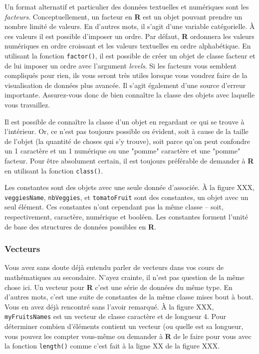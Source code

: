 \documentclass[10.5pt,a4paper]{article}
\begin{document}
    Un format alternatif et particulier des données textuelles et numériques sont les \emph{facteurs}. Conceptuellement, un facteur en \textbf{R} est un objet pouvant prendre un nombre limité de valeurs. En d'autres mots, il s'agit d'une variable catégorielle. À ces valeurs il est possible d'imposer un ordre. Par défaut, \textbf{R} ordonnera les valeurs numériques en ordre croissant et les valeurs textuelles en ordre alphabétique. En utilisant la fonction \texttt{factor()}, il est possible de créer un objet de classe facteur et de lui imposer un ordre avec l'argument \emph{levels}. Si les facteurs vous semblent compliqués pour rien, ils vous seront très utiles lorsque vous voudrez faire de la visualisation de données plus avancée. Il s'agit également d'une source d'erreur importante. Assurez-vous donc de bien connaître la classe des objets avec laquelle vous travaillez.
    
    Il est possible de connaître la classe d'un objet en regardant ce qui se trouve à l'intérieur. Or, ce n'est pas toujours possible ou évident, soit à cause de la taille de l'objet (la quantité de choses qui s'y trouve), soit parce qu'on peut confondre un 1 caractère et un 1 numérique ou une "pomme" caractère et une "pomme" facteur. Pour être absolument certain, il est toujours préférable de demander à \textbf{R} en utilisant la fonction \texttt{class()}.
    
    Les constantes sont des objets avec une seule donnée d'associée. À la figure XXX, \texttt{veggiesName}, \texttt{nbVeggies}, et \texttt{tomatoFruit} sont des constantes, un objet avec un seul élément. Ces constantes n'ont cependant pas la même classe -- soit, respectivement, caractère, numérique et booléen. Les constantes forment l'unité de base des structures de données possibles en \textbf{R}. 
    
    \subsubsection{Vecteurs}
    Vous avez sans doute déjà entendu parler de vecteurs dans vos cours de mathématiques au secondaire. N'ayez crainte, il n'est pas question de la même chose ici. Un vecteur pour \textbf{R} c'est une série de données du même type. En d'autres mots, c'est une suite de constantes de la même classe mises bout à bout. Vous en avez déjà rencontré sans l'avoir remarqué. À la figure XXX, \texttt{myFruitsNames} est un vecteur de classe caractère et de longueur 4. Pour déterminer combien d'éléments contient un vecteur (ou quelle est sa longueur, vous pouvez les compter vous-même ou demander à \textbf{R} de le faire pour vous avec la fonction \texttt{length()} comme c'est fait à la ligne XX de la figure XXX. 
    
\end{document}
